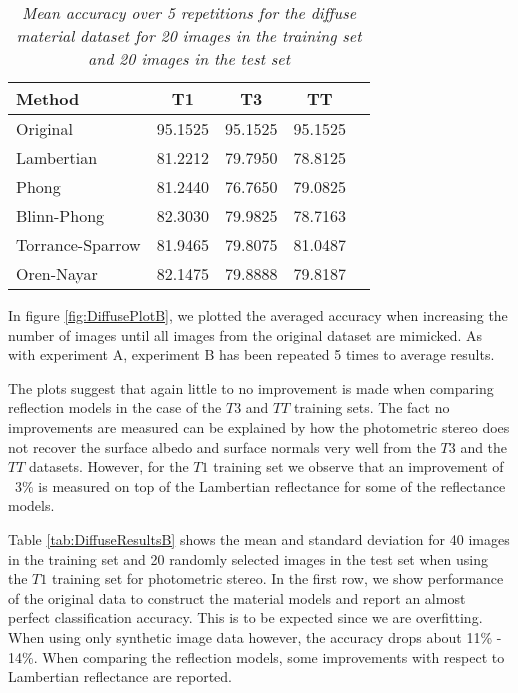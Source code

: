 \begin{table}
	\center
	\begin{tabular}{l|c|c|c|r}
	Method 				&	T1  	&	T3 		&	TT	\\
	\hline
	Original			&	95.1525	&	95.1525 &	95.1525	\\
	Lambertian 			&	81.2212	&	79.7950	&	78.8125	\\
	Phong 				&	81.2440	&	76.7650 &	79.0825	\\
	Blinn-Phong 		& 	82.3030 &	79.9825 &	78.7163	\\
	Torrance-Sparrow 	&	81.9465 &	79.8075 &	81.0487	\\
	Oren-Nayar 			&	82.1475 &	79.8888 &	79.8187	\\
	\end{tabular}
	\caption{{\it Mean accuracy over 5 repetitions for the diffuse material dataset for 20 images in the training set and 20 images in the test set}}
	\label{tab:DiffuseResultsA}
\end{table}

In figure \ref{fig:DiffusePlotB}, we plotted the averaged accuracy when increasing the number of images until all images from the original dataset are mimicked. As with experiment A, experiment B has been repeated 5 times to average results. 

The plots suggest that again little to no improvement is made when comparing reflection models in the case of the $T3$ and $TT$ training sets. The fact no improvements are measured can be explained by how the photometric stereo does not recover the surface albedo and surface normals very well from the $T3$ and the $TT$ datasets. However, for the $T1$ training set we observe that an improvement of ~3\% is measured on top of the Lambertian reflectance for some of the reflectance models. 

Table \ref{tab:DiffuseResultsB} shows the mean and standard deviation for 40 images in the training set and 20 randomly selected images in the test set when using the $T1$ training set for photometric stereo. In the first row, we show performance of the original data to construct the material models and report an almost perfect classification accuracy. This is to be expected since we are overfitting. When using only synthetic image data however, the accuracy drops about 11\% - 14\%. When comparing the reflection models, some improvements with respect to Lambertian reflectance are reported. 

